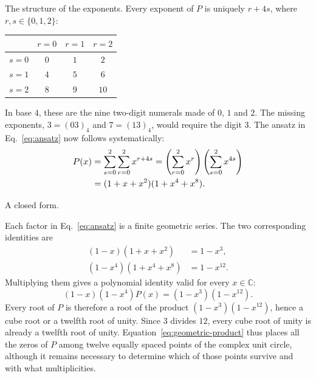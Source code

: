 \documentclass[11pt,aspectratio=169]{beamer}
\newcommand{\slidebody}{%
  \fontsize{10.6}{12.8}\selectfont\justifying%
  \setlength{\parskip}{4.2pt}%
  \setlength{\abovedisplayskip}{4pt}%
  \setlength{\belowdisplayskip}{4pt}%
  \setlength{\abovedisplayshortskip}{2pt}%
  \setlength{\belowdisplayshortskip}{2.5pt}%
}
\newcommand{\tightbody}{\slidebody\fontsize{10.2}{12.3}\selectfont\setlength{\parskip}{3pt}}
\newcommand{\smallequation}{\fontsize{10.5}{13}\selectfont}
\begin{document}
\begin{frame}[t]{The structure of the exponents.}
\tightbody
\setlength{\parskip}{2pt}
Every exponent of $P$ is uniquely $r+4s$, where $r,s\in\{0,1,2\}$:
\vspace{-1mm}
\begin{center}
\renewcommand{\arraystretch}{1.08}
\begin{tabular}{c|ccc}
  & $r=0$ & $r=1$ & $r=2$\\\hline
 $s=0$ & $0$ & $1$ & $2$\\
 $s=1$ & $4$ & $5$ & $6$\\
 $s=2$ & $8$ & $9$ & $10$
\end{tabular}
\end{center}
In base $4$, these are the nine two-digit numerals made of $0$, $1$ and $2$. The missing exponents, $3=(03)_4$ and $7=(13)_4$, would require the digit $3$. The ansatz in Eq.~\eqref{eq:ansatz} now follows systematically:
\begin{equation}\label{eq:double-sum}
\smallequation
\begin{aligned}
 P(x)&=\sum_{s=0}^{2}\sum_{r=0}^{2}x^{r+4s}
     =\left(\sum_{r=0}^{2}x^r\right)
      \left(\sum_{s=0}^{2}x^{4s}\right)\\
     &=(1+x+x^2)(1+x^4+x^8).
\end{aligned}
\end{equation}
\end{frame}

\begin{frame}[t]{A closed form.}
\slidebody
Each factor in Eq.~\eqref{eq:ansatz} is a finite geometric series. The two corresponding identities are
\begin{subequations}\label{eq:geometric-series}
\begin{align}
 (1-x)(1+x+x^2)   &=1-x^3,\label{eq:geometric-series-a}\\
 (1-x^4)(1+x^4+x^8)&=1-x^{12}.\label{eq:geometric-series-b}
\end{align}
\end{subequations}
Multiplying them gives a polynomial identity valid for every $x\in\mathbb C$:
\begin{equation}\label{eq:geometric-product}
 (1-x)(1-x^4)P(x)=(1-x^3)(1-x^{12}).
\end{equation}
Every root of $P$ is therefore a root of the product $(1-x^3)(1-x^{12})$, hence a cube root or a twelfth root of unity. Since $3$ divides $12$, every cube root of unity is already a twelfth root of unity. Equation~\eqref{eq:geometric-product} thus places all the zeros of $P$ among twelve equally spaced points of the complex unit circle, although it remains necessary to determine which of those points survive and with what multiplicities.
\end{frame}
\end{document}
